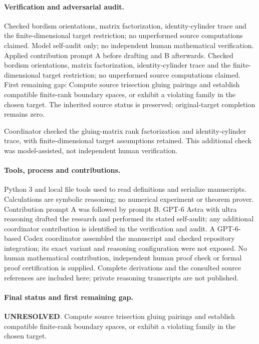 \documentclass[11pt]{article}
\begin{document}
\paragraph{Verification and adversarial audit.}
Checked bordism orientations, matrix factorization, identity-cylinder trace and the finite-dimensional target restriction; no unperformed source computations claimed. Model self-audit only; no independent human mathematical verification. Applied contribution prompt A before drafting and B afterwards. Checked bordism orientations, matrix factorization, identity-cylinder trace and the finite-dimensional target restriction; no unperformed source computations claimed. First remaining gap: Compute source trisection gluing pairings and establish compatible finite-rank boundary spaces, or exhibit a violating family in the chosen target. The inherited source status is preserved; original-target completion remains zero.

Coordinator checked the gluing-matrix rank factorization and identity-cylinder trace, with finite-dimensional target assumptions retained. This additional check was model-assisted, not independent human verification.

\paragraph{Tools, process and contributions.}
Python 3 and local file tools used to read definitions and serialize manuscripts. Calculations are symbolic reasoning; no numerical experiment or theorem prover. Contribution prompt A was followed by prompt B. GPT-6 Astra with ultra reasoning drafted the research and performed its stated self-audit; any additional coordinator contribution is identified in the verification and audit. A GPT-6-based Codex coordinator assembled the manuscript and checked repository integration; its exact variant and reasoning configuration were not exposed. No human mathematical contribution, independent human proof check or formal proof certification is supplied. Complete derivations and the consulted source references are included here; private reasoning transcripts are not published.

\paragraph{Final status and first remaining gap.}
\textbf{UNRESOLVED}. Compute source trisection gluing pairings and establish compatible finite-rank boundary spaces, or exhibit a violating family in the chosen target.
\end{document}
